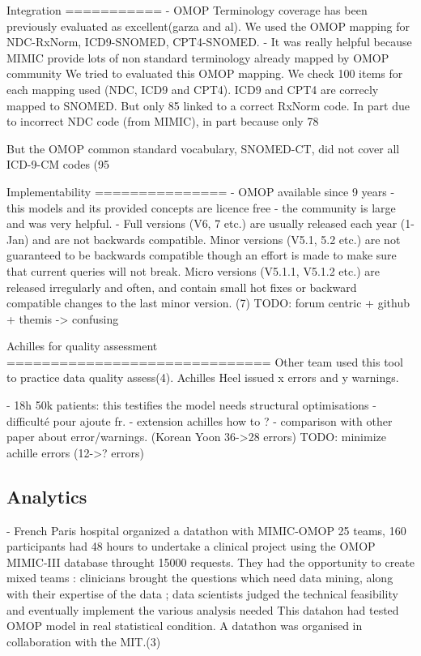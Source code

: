Integration
===========
- OMOP Terminology coverage has been previously evaluated as excellent(garza and al). We used the OMOP mapping for NDC-RxNorm, ICD9-SNOMED, CPT4-SNOMED.
- It was really helpful because MIMIC provide lots of non standard terminology already mapped by OMOP community
We tried to evaluated this OMOP mapping.
We check 100 items for each mapping used (NDC, ICD9 and CPT4). ICD9 and CPT4 are correcly mapped to SNOMED. But only 85%
linked to a correct RxNorm code. In part due to incorrect NDC code (from MIMIC), in part because only 78%

But the OMOP common standard vocabulary, SNOMED-CT, did not cover all ICD-9-CM codes (95%
 
Implementability
===============
- OMOP available since 9 years
- this models and its provided concepts are licence free
- the community is large and was very helpful.
- Full versions (V6, 7 etc.) are usually released each year (1-Jan) and are not backwards compatible. 
Minor versions (V5.1, 5.2 etc.) are not guaranteed to be backwards compatible though an effort is made to make sure that current queries will not break. 
Micro versions (V5.1.1, V5.1.2 etc.) are released irregularly and often, and contain small hot fixes or backward compatible changes to the last minor version.
(7)
TODO: forum centric + github + themis -> confusing

Achilles for quality assessment
==============================
Other team used this tool to practice data quality assess(4).
Achilles Heel issued x errors and y warnings.

- 18h 50k patients: this testifies the model needs structural optimisations
- difficulté pour ajoute fr. 
- extension achilles how to ?
- comparison with other paper about error/warnings. (Korean Yoon 36->28 errors)
TODO: minimize achille errors  (12->? errors)
\subsection{Analytics}

- French Paris hospital organized a datathon with MIMIC-OMOP
25 teams, 160 participants had 48 hours to undertake a clinical project using the OMOP MIMIC-III database throught 15000 requests. They had the opportunity to create mixed teams : clinicians brought the questions which need data mining, along with their expertise of the data ; data scientists judged the technical feasibility and eventually implement the various analysis needed
This datahon had tested OMOP model in real statistical condition. A datathon was organised in collaboration with the MIT.(3)

